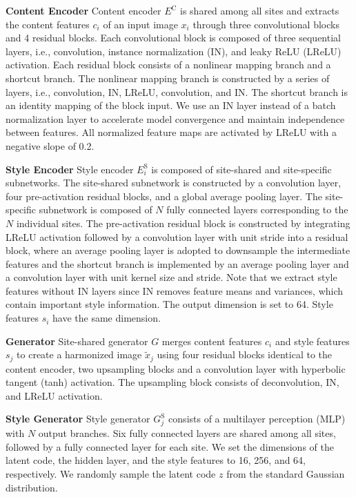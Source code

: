 \documentclass{nature}
\begin{document}
\begin{methods}
\textbf{Content Encoder} Content encoder $E^{\text{C}}$ is shared among all sites and extracts the content features $c_i$ of an input image $x_i$ through three convolutional blocks and 4 residual blocks.
Each convolutional block is composed of three sequential layers, i.e., convolution, instance normalization (IN)\cite{Ulyanov2017Improved}, and leaky ReLU (LReLU) activation.
Each residual block consists of a nonlinear mapping branch and a shortcut branch. The nonlinear mapping branch is constructed by a series of layers, i.e., convolution, IN, LReLU, convolution, and IN. The shortcut branch is an identity mapping of the block input.
We use an IN layer instead of a batch normalization layer\cite{Ulyanov2017Improved} to accelerate model convergence and maintain independence between features.
All normalized feature maps are activated by LReLU with a negative slope of 0.2.

\textbf{Style Encoder} Style encoder $E_i^{\text{S}}$ is composed of site-shared and site-specific subnetworks.
The site-shared subnetwork is constructed by a convolution layer, four pre-activation residual blocks, and a global average pooling layer.
The site-specific subnetwork is composed of $N$ fully connected layers corresponding to the $N$ individual sites.
The pre-activation residual block is constructed by integrating LReLU activation followed by a convolution layer with unit stride into a residual block, where an average pooling layer is adopted to downsample the intermediate features and the shortcut branch is implemented by an average pooling layer and a convolution layer with unit kernel size and stride. 
Note that we extract style features without IN layers since IN removes feature means and variances, which contain important style information.
The output dimension is set to 64. Style features $s_i$ have the same dimension.

\textbf{Generator} Site-shared generator $G$ merges content features $c_i$ and style features $s_j$ to create a harmonized image $\tilde{x}_j$ using four residual blocks identical to the content encoder, two upsampling blocks and a convolution layer with hyperbolic tangent (tanh) activation. The upsampling block consists of deconvolution, IN, and LReLU activation.

\textbf{Style Generator} Style generator $G^{\text{S}}_j$ consists of a multilayer perception (MLP) with $N$ output branches.
Six fully connected layers are shared among all sites, followed by a fully connected layer for each site.
We set the dimensions of the latent code, the hidden layer, and the style features to 16, 256, and 64, respectively.
We randomly sample the latent code $z$ from the standard Gaussian distribution.


\end{methods}
\end{document}
